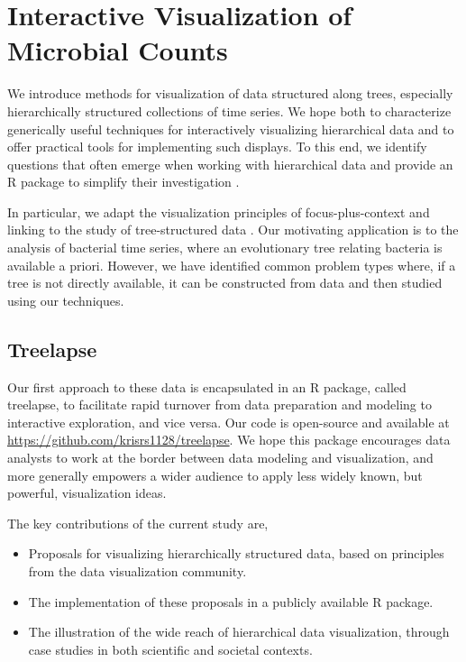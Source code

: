 \chapter{Interactive Visualization of Microbial Counts}
\label{ch:interactive_vis}

We introduce methods for visualization of data structured along trees,
especially hierarchically structured collections of time series. We hope both to
characterize generically useful techniques for interactively visualizing
hierarchical data and to offer practical tools for implementing such displays.
To this end, we identify questions that often emerge when working with
hierarchical data and provide an R package to simplify their investigation
\citep{rlanguage}.

In particular, we adapt the visualization principles of focus-plus-context and
linking to the study of tree-structured data \citep{buja1996interactive,
  becker1987brushing}. Our motivating application is to the analysis of
bacterial time series, where an evolutionary tree relating bacteria is available
a priori. However, we have identified common problem types where, if a tree is
not directly available, it can be constructed from data and then studied using
our techniques.

\section{Treelapse}\label{introduction}

Our first approach to these data is encapsulated in an R package, called
treelapse, to facilitate rapid turnover from data preparation and modeling to
interactive exploration, and vice versa. Our code is open-source and available
at \url{https://github.com/krisrs1128/treelapse}. We hope this package
encourages data analysts to work at the border between data modeling and
visualization, and more generally empowers a wider audience to apply less widely
known, but powerful, visualization ideas.

The key contributions of the current study are,
\begin{itemize}
\item Proposals for visualizing hierarchically structured data, based on
  principles from the data visualization community.
\item The implementation of these proposals in a publicly available R package.
\item The illustration of the wide reach of hierarchical data visualization,
  through case studies in both scientific and societal contexts.
\end{itemize}

